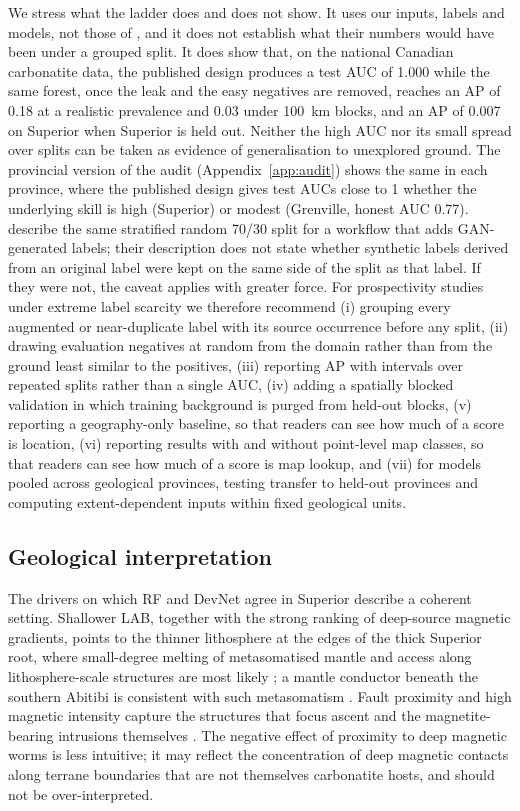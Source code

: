 \documentclass[pdflatex,sn-apa]{sn-jnl}
\begin{document}
We stress what the ladder does and does not show. It uses our inputs, labels and models, not those of \citet{Parsa2024}, and it does not establish what their numbers would have been under a grouped split. It does show that, on the national Canadian carbonatite data, the published design produces a test AUC of 1.000 while the same forest, once the leak and the easy negatives are removed, reaches an AP of 0.18 at a realistic prevalence and 0.03 under 100~km blocks, and an AP of 0.007 on Superior when Superior is held out. Neither the high AUC nor its small spread over splits can be taken as evidence of generalisation to unexplored ground. The provincial version of the audit (Appendix~\ref{app:audit}) shows the same in each province, where the published design gives test AUCs close to 1 whether the underlying skill is high (Superior) or modest (Grenville, honest AUC 0.77). \citet{Parsa2025} describe the same stratified random 70/30 split for a workflow that adds GAN-generated labels; their description does not state whether synthetic labels derived from an original label were kept on the same side of the split as that label. If they were not, the caveat applies with greater force. For prospectivity studies under extreme label scarcity we therefore recommend (i) grouping every augmented or near-duplicate label with its source occurrence before any split, (ii) drawing evaluation negatives at random from the domain rather than from the ground least similar to the positives, (iii) reporting AP with intervals over repeated splits rather than a single AUC, (iv) adding a spatially blocked validation in which training background is purged from held-out blocks, (v) reporting a geography-only baseline, so that readers can see how much of a score is location, (vi) reporting results with and without point-level map classes, so that readers can see how much of a score is map lookup, and (vii) for models pooled across geological provinces, testing transfer to held-out provinces and computing extent-dependent inputs within fixed geological units.

\subsection{Geological interpretation}\label{sec:disc-geology}

The drivers on which RF and DevNet agree in Superior describe a coherent setting. Shallower LAB, together with the strong ranking of deep-source magnetic gradients, points to the thinner lithosphere at the edges of the thick Superior root, where small-degree melting of metasomatised mantle and access along lithosphere-scale structures are most likely \citep{Griffin2013,Groves2021,Hoggard2020}; a mantle conductor beneath the southern Abitibi is consistent with such metasomatism \citep{Snyder2021}. Fault proximity and high magnetic intensity capture the structures that focus ascent and the magnetite-bearing intrusions themselves \citep{Thomas2016}. The negative effect of proximity to deep magnetic worms is less intuitive; it may reflect the concentration of deep magnetic contacts along terrane boundaries that are not themselves carbonatite hosts, and should not be over-interpreted.
\end{document}
